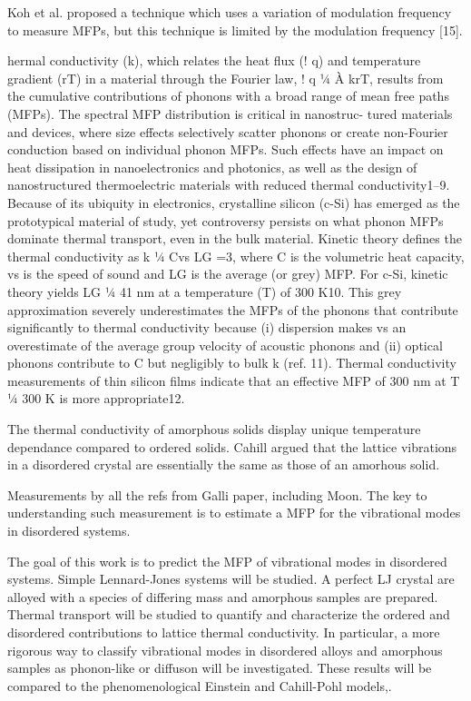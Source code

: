 \documentclass[aps,prb,twocolumn,superscriptaddress,footinbib,amsmath,amssymb,floatfix]{revtex4}
\begin{document}
Koh
et al. proposed a technique which uses a variation of
modulation frequency to measure MFPs, but this technique
is limited by the modulation frequency [15].
\cite{koh_frequency_2007}

hermal conductivity (k), which relates the heat flux (!
q)
and temperature gradient (rT) in a material through the
Fourier law, !
q 1⁄4 À krT, results from the cumulative
contributions of phonons with a broad range of mean free paths
(MFPs). The spectral MFP distribution is critical in nanostruc-
tured materials and devices, where size effects selectively scatter
phonons or create non-Fourier conduction based on individual
phonon MFPs. Such effects have an impact on heat dissipation in
nanoelectronics and photonics, as well as the design of
nanostructured thermoelectric materials with reduced thermal
conductivity1–9. Because of its ubiquity in electronics, crystalline
silicon (c-Si) has emerged as the prototypical material of study,
yet controversy persists on what phonon MFPs dominate thermal
transport, even in the bulk material. Kinetic theory defines the
thermal conductivity as k 1⁄4 Cvs LG =3, where C is the volumetric
heat capacity, vs is the speed of sound and LG is the average
(or grey) MFP. For c-Si, kinetic theory yields LG 1⁄4 41 nm at a
temperature (T) of 300 K10. This grey approximation severely
underestimates the MFPs of the phonons that contribute
significantly to thermal conductivity because (i) dispersion
makes vs an overestimate of the average group velocity of
acoustic phonons and (ii) optical phonons contribute to C but
negligibly to bulk k (ref. 11). Thermal conductivity measurements
of thin silicon films indicate that an effective MFP of 300 nm at
T 1⁄4 300 K is more appropriate12.

The thermal conductivity of amorphous solids display 
unique temperature dependance compared to ordered solids.
\cite{freeman_thermal_1986} 
Cahill argued that the lattice vibrations 
in a disordered crystal are essentially the same as those of an amorhous 
solid.
\cite{cahill_lower_1992} 

Measurements by all the refs from Galli paper, including Moon.
\cite{wada_thermal_1996,zink_thermal_2006,yang_anomalously_2010,
cahill_thermal_1994,kuo_thermal_1992,moon_thermal_2002,liu_high_2009}
The key to understanding such measurement is to estimate a MFP for the 
vibrational modes in disordered systems. 

The goal of this work is to predict the MFP of vibrational modes in 
disordered systems. Simple Lennard-Jones systems will be studied.  A 
perfect LJ crystal are alloyed with a species of differing mass and 
amorphous samples are prepared. Thermal transport will be studied to 
quantify and characterize the ordered and 
disordered contributions to lattice thermal conductivity. In particular, a 
more rigorous way to classify vibrational modes in disordered alloys and 
amorphous samples as phonon-like or diffuson will be investigated. These 
results will be compared to the phenomenological Einstein and Cahill-Pohl 
models,\cite{einstein1911,kittel1949,cahill1992}.
\end{document}

